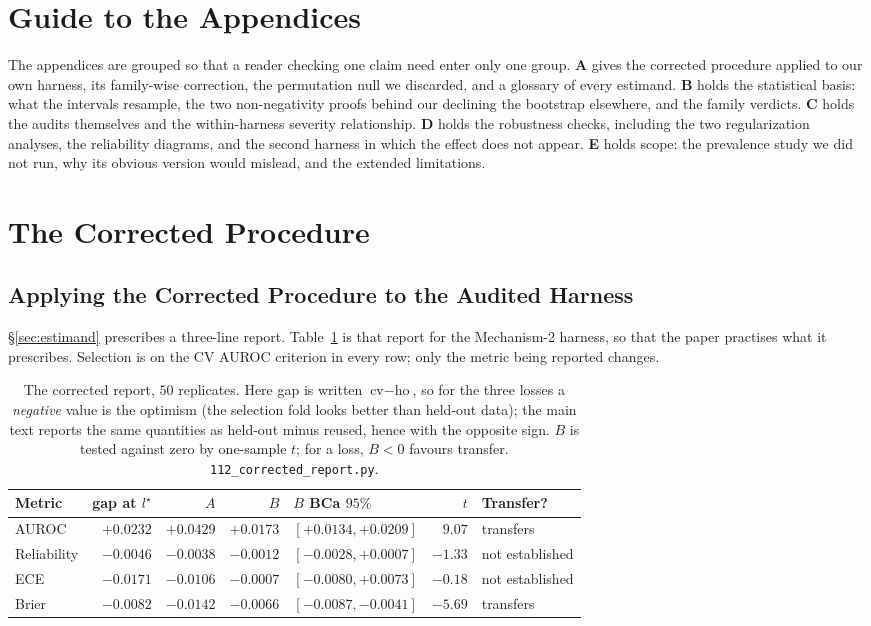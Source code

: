 \documentclass{article}
\begin{document}
\appendix
\section*{Guide to the Appendices}

The appendices are grouped so that a reader checking one claim need enter only
one group. \textbf{A} gives the corrected procedure applied to our own
harness, its family-wise correction, the permutation null we discarded, and a
glossary of every estimand. \textbf{B} holds the statistical basis: what the
intervals resample, the two non-negativity proofs behind our declining the
bootstrap elsewhere, and the family verdicts. \textbf{C} holds the audits
themselves and the within-harness severity relationship. \textbf{D} holds the
robustness checks, including the two regularization analyses, the reliability
diagrams, and the second harness in which the effect does not appear.
\textbf{E} holds scope: the prevalence study we did not run, why its obvious
version would mislead, and the extended limitations.

\section{The Corrected Procedure}

\subsection{Applying the Corrected Procedure to the Audited Harness}
\label{app:mechnull}

\S\ref{sec:estimand} prescribes a three-line report. Table~\ref{tab:corrected}
is that report for the Mechanism-2 harness, so that the paper practises what
it prescribes. Selection is on the CV AUROC criterion in every row; only the
metric being reported changes.

\begin{table}[h]
\centering
\small
\begin{tabular}{@{}lrrrlrl@{}}
\toprule
Metric & gap at $l^\star$ & $A$ & $B$ & $B$ BCa $95\%$ & $t$ & Transfer? \\
\midrule
AUROC & $+0.0232$ & $+0.0429$ & $+0.0173$ & $[+0.0134,+0.0209]$ & $9.07$ & transfers \\
Reliability & $-0.0046$ & $-0.0038$ & $-0.0012$ & $[-0.0028,+0.0007]$ & $-1.33$ & not established \\
ECE & $-0.0171$ & $-0.0106$ & $-0.0007$ & $[-0.0080,+0.0073]$ & $-0.18$ & not established \\
Brier & $-0.0082$ & $-0.0142$ & $-0.0066$ & $[-0.0087,-0.0041]$ & $-5.69$ & transfers \\
\bottomrule
\end{tabular}
\caption{The corrected report, $50$ replicates. Here gap is written
$\text{cv}-\text{ho}$, so for the three losses a \emph{negative} value is the
optimism (the selection fold looks better than held-out data); the main text
reports the same quantities as held-out minus reused, hence with the opposite
sign. $B$ is tested against zero by one-sample $t$; for a loss, $B<0$ favours
transfer. \texttt{112\_corrected\_report.py}.}
\label{tab:corrected}
\end{table}
\end{document}
